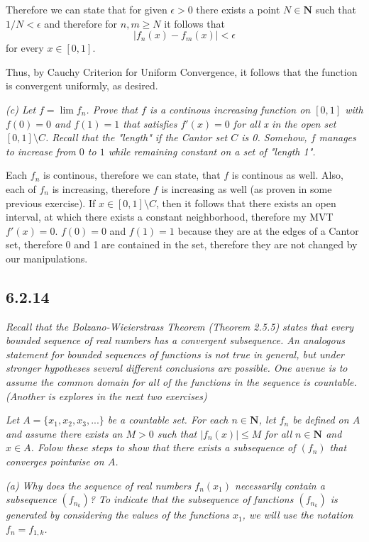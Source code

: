 \documentclass[11pt,oneside,titlepage]{book}
\begin{document}
Therefore we can state that for given $\epsilon > 0$ there exists a
point $N \in \textbf{N}$ such that $1/N < \epsilon$ and therefore
for $n, m \geq N$ it follows that 
$$|f_n(x) - f_m(x)| < \epsilon$$
for every $x \in [0, 1]$.

Thus, by Cauchy Criterion for Uniform Convergence, it follows that the
function is convergent uniformly, as desired.

\textit{(c) Let $f = \lim{f_n}$. Prove that $f$ is a continous increasing
  function on $[0, 1]$ with $f(0) = 0$ and $f(1) = 1$ that satisfies
  $f'(x) = 0$ for all x in the open set $[0, 1] \setminus C$. Recall that the
  "length" if the Cantor set $C$ is 0. Somehow, $f$ manages to increase from
  $0$ to $1$ while remaining constant on a set of "length 1".}

Each $f_n$ is continous, therefore we can state, that $f$ is continous as well.
Also, each of $f_n$ is increasing, therefore $f$ is increasing as well (as
proven in some previous exercise). If $x \in [0, 1] \setminus C$, then it
follows that there exists an open interval, at which there exists a constant
neighborhood, therefore my MVT $f'(x) = 0$. $f(0) = 0$ and $f(1) = 1$
because they are at the edges of a Cantor set, therefore 0 and 1 are
contained in the set, therefore they are
not changed by our manipulations.

\subsection*{6.2.14}
\textit{Recall that the Bolzano-Wieierstrass Theorem (Theorem 2.5.5) states
  that every bounded sequence of real numbers has a convergent subsequence. An
  analogous statement for bounded sequences of functions is not true in
  general, but under stronger hypotheses several different conclusions are
  possible. One avenue is to assume the common domain for all of the functions
  in the sequence is countable. (Another is explores in the next two
  exercises)}

\textit{Let $A = \{x_1, x_2, x_3, ... \}$ be a countable set. For each
  $n \in \textbf{N}$, let $f_n$ be defined on $A$ and assume there exists an
  $M > 0$ such that $|f_n(x)| \leq M$ for all $n \in \textbf{N}$ and
  $x \in A$. Folow these steps to show that there exists a subsequence of
  $(f_n)$ that converges pointwise on $A$.}

\textit{(a) Why does the sequence of real numbers $f_n(x_1)$ necessarily
  contain a subsequence $(f_{n_k})$? To indicate that the subsequence of
  functions $(f_{n_k})$ is generated by considering the values of the functions
  $x_1$, we will use the notation $f_n = f_{1,k}$.}
\end{document}
